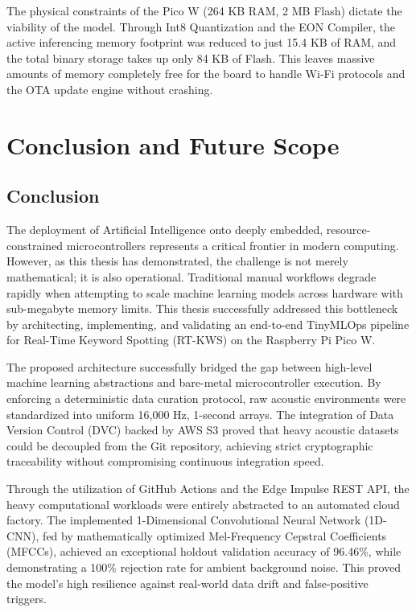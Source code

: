 \documentclass[11pt,a4paper,openany]{book}
\begin{document}
The physical constraints of the Pico W (264 KB RAM, 2 MB Flash) dictate the viability of the model. Through Int8 Quantization and the EON Compiler, the active inferencing memory footprint was reduced to just 15.4 KB of RAM, and the total binary storage takes up only 84 KB of Flash. This leaves massive amounts of memory completely free for the board to handle Wi-Fi protocols and the OTA update engine without crashing.

\chapter{Conclusion and Future Scope}

\section{Conclusion}
The deployment of Artificial Intelligence onto deeply embedded, resource-constrained microcontrollers represents a critical frontier in modern computing. However, as this thesis has demonstrated, the challenge is not merely mathematical; it is also operational. Traditional manual workflows degrade rapidly when attempting to scale machine learning models across hardware with sub-megabyte memory limits. This thesis successfully addressed this bottleneck by architecting, implementing, and validating an end-to-end TinyMLOps pipeline for Real-Time Keyword Spotting (RT-KWS) on the Raspberry Pi Pico W.

The proposed architecture successfully bridged the gap between high-level machine learning abstractions and bare-metal microcontroller execution. By enforcing a deterministic data curation protocol, raw acoustic environments were standardized into uniform 16,000 Hz, 1-second arrays. The integration of Data Version Control (DVC) backed by AWS S3 proved that heavy acoustic datasets could be decoupled from the Git repository, achieving strict cryptographic traceability without compromising continuous integration speed.

Through the utilization of GitHub Actions and the Edge Impulse REST API, the heavy computational workloads were entirely abstracted to an automated cloud factory. The implemented 1-Dimensional Convolutional Neural Network (1D-CNN), fed by mathematically optimized Mel-Frequency Cepstral Coefficients (MFCCs), achieved an exceptional holdout validation accuracy of 96.46\%, while demonstrating a 100\% rejection rate for ambient background noise. This proved the model's high resilience against real-world data drift and false-positive triggers.
\end{document}
